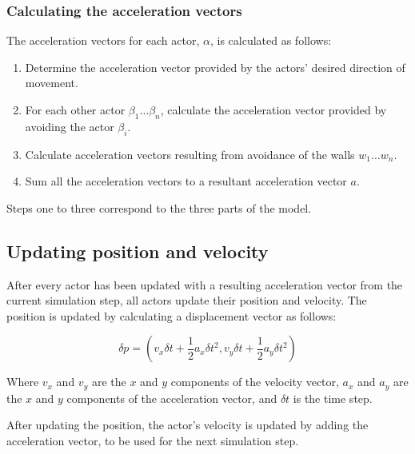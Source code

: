 \subsubsection{Calculating the acceleration vectors}
The acceleration vectors for each actor, $\alpha$, is calculated as follows:

\begin{enumerate}
    \item Determine the acceleration vector provided by the actors' desired 
        direction of movement.
    \item For each other actor $\beta_1\dots\beta_n$, calculate the 
        acceleration vector provided by avoiding the actor $\beta_i$.
    \item Calculate acceleration vectors resulting from avoidance of the walls 
        $w_1\dots w_n$.
    \item Sum all the acceleration vectors to a resultant acceleration vector 
        $a$.
\end{enumerate}

Steps one to three correspond to the three parts of the model.

\subsection{Updating position and velocity}
After every actor has been updated with a resulting acceleration vector from 
the current simulation step, all actors update their position and velocity.  
The position is updated by calculating a displacement vector as follows:

\begin{equation}
    \delta p = (v_x \delta t + \frac{1}{2}a_x \delta t^2, v_y \delta t + 
    \frac{1}{2}a_y \delta t^2)
\end{equation}

Where $v_x$ and $v_y$ are the $x$ and $y$ components of the velocity vector, 
$a_x$ and $a_y$ are the $x$ and $y$ components of the acceleration vector, and 
$\delta t$ is the time step.

After updating the position, the actor's velocity is updated by adding the 
acceleration vector, to be used for the next simulation step.

%
%
%
%
%
%
%
